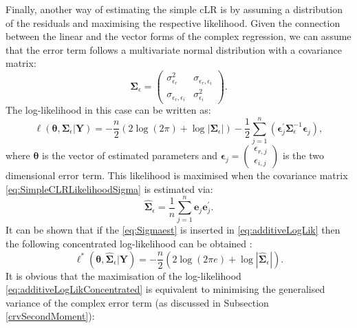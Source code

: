\documentclass[
]{book}
\begin{document}
Finally, another way of estimating the simple cLR is by assuming a distribution of the residuals and maximising the respective likelihood. Given the connection between the linear and the vector forms of the complex regression, we can assume that the error term follows a multivariate normal distribution with a covariance matrix:
\begin{equation}
    \boldsymbol{\Sigma}_\epsilon = \begin{pmatrix} \sigma_{\epsilon_r}^2 & \sigma_{\epsilon_r, \epsilon_i} \\ \sigma_{\epsilon_r, \epsilon_i} & \sigma_{\epsilon_i}^2 \end{pmatrix} .
    \label{eq:SimpleCLRLikelihoodSigma}
\end{equation}
The log-likelihood in this case can be written as:
\begin{equation}
    \ell(\boldsymbol{\theta}, \boldsymbol{\Sigma}_\epsilon | \mathbf{Y}) = -\frac{n}{2} \left( 2 \log(2 \pi) + \log | \boldsymbol{\Sigma}_\epsilon| \right) -\frac{1}{2} \sum_{j=1}^n \left( \boldsymbol{\epsilon}_j^\prime \boldsymbol{\Sigma}_\epsilon^{-1} \boldsymbol{\epsilon}_j \right) ,
    \label{eq:additiveLogLik}
\end{equation}
where \(\boldsymbol{\theta}\) is the vector of estimated parameters and \(\boldsymbol{\epsilon}_j = \begin{pmatrix} \epsilon_{r,j} \\ \epsilon_{i,j} \end{pmatrix}\) is the two dimensional error term. This likelihood is maximised when the covariance matrix \eqref{eq:SimpleCLRLikelihoodSigma} is estimated via:
\begin{equation}
    \hat{\boldsymbol{\Sigma}}_\epsilon = \frac{1}{n} \sum_{j=1}^{n} \boldsymbol{e}_j \boldsymbol{e}_j^\prime .
    \label{eq:Sigmaest}
\end{equation}
It can be shown that if the \eqref{eq:Sigmaest} is inserted in \eqref{eq:additiveLogLik} then the following concentrated log-likelihood can be obtained \citep[see, for example,][]{Snyder2017}:
\begin{equation}
    \ell^*(\boldsymbol{\theta}, \hat{\boldsymbol{\Sigma}}_\epsilon | \mathbf{Y}) = -\frac{n}{2} \left( 2 \log(2 \pi e) + \log | \hat{\boldsymbol{\Sigma}}_\epsilon | \right) .
    \label{eq:additiveLogLikConcentrated}
\end{equation}
It is obvious that the maximisation of the log-likelihood \eqref{eq:additiveLogLikConcentrated} is equivalent to minimising the generalised variance of the complex error term (as discussed in Subsection \ref{crvSecondMoment}):
\end{document}
